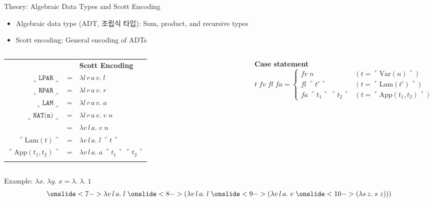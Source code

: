 \documentclass[aspectratio=169, 10pt]{beamer}
\newcommand{\concrep}[1]{\llcorner#1\lrcorner}
\newcommand{\absrep}[1]{\ulcorner#1\urcorner}
\begin{document}
\begin{frame}{Theory: Algebraic Data Types and Scott Encoding}
    \begin{itemize}
        \item Algebraic data type (ADT, 조립식 타입): Sum, product, and recursive types
        \item<2-> Scott encoding: General encoding of ADTs
    \end{itemize}

    \begin{columns}
    \begin{table}[]
        \begin{tabular}{rcl}
             {
            \textbf{Constructor} & & \textbf{Scott Encoding} \\
            $\concrep{\texttt{LPAR}}$       & = & $\lambda l\, r\, a\, v.\; l$ \\
            $\concrep{\texttt{RPAR}}$       & = & $\lambda l\, r\, a\, v.\; r$ \\
            $\concrep{\texttt{LAM}}$        & = & $\lambda l\, r\, a\, v.\; a$ \\
            $\concrep{\texttt{NAT(n)}}$     & = & $\lambda l\, r\, a\, v.\; v\; n$ \\
            \hline} \onslide<4-> {%
            $\absrep{\text{Var}(n)}$        & = & $\lambda v\, l\, a.\; v\; n$ \\
            $\absrep{\text{Lam}(t)}$        & = & $\lambda v\, l\, a.\; l\; \absrep{t}$ \\
            $\absrep{\text{App}(t_1, t_2)}$ & = & $\lambda v\, l\, a.\; a\; \absrep{t_1}\; \absrep{t_2}$ \\
            }
        \end{tabular}
    \end{table}

     {
    \textbf{Case statement}
    \[
        t\; fv\; fl\; fa = \begin{cases}
            fv\; n                           & (t = \absrep{\text{Var}(n)}) \\
            fl\; \absrep{t'}                 & (t = \absrep{\text{Lam}(t')}) \\
            fa\; \absrep{t_1}\; \absrep{t_2} & (t = \absrep{\text{App}(t_1, t_2)})
        \end{cases}
    \]
    }
    \end{columns}

     {
    \begin{exampleblock}{Example: $\lambda x.\; \lambda y.\; x = \lambda.\; \lambda.\; 1$}
        \[
            \onslide<7-> {\lambda v\, l\, a.\; l\;
                \onslide<8-> {(\lambda v\, l\, a.\; l\;
                    \onslide<9-> {(\lambda v\, l\, a.\; v\;
                        \onslide <10-> {(\lambda s\, z.\; s\; z)}
                    )}
                )}
            }
        \]
    \end{exampleblock}
    }
\end{frame}
\end{document}
